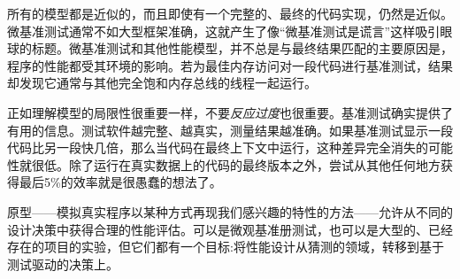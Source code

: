 所有的模型都是近似的，而且即使有一个完整的、最终的代码实现，仍然是近似。微基准测试通常不如大型框架准确，这就产生了像“微基准测试是谎言”这样吸引眼球的标题。微基准测试和其他性能模型，并不总是与最终结果匹配的主要原因是，程序的性能都受其环境的影响。若为最佳内存访问对一段代码进行基准测试，结果却发现它通常与其他完全饱和内存总线的线程一起运行。 

正如理解模型的局限性很重要一样，不要\textit{反应过度}也很重要。基准测试确实提供了有用的信息。测试软件越完整、越真实，测量结果越准确。如果基准测试显示一段代码比另一段快几倍，那么当代码在最终上下文中运行，这种差异完全消失的可能性就很低。除了运行在真实数据上的代码的最终版本之外，尝试从其他任何地方获得最后5\%的效率就是很愚蠢的想法了。

原型——模拟真实程序以某种方式再现我们感兴趣的特性的方法——允许从不同的设计决策中获得合理的性能评估。可以是微观基准册测试，也可以是大型的、已经存在的项目的实验，但它们都有一个目标:将性能设计从猜测的领域，转移到基于测试驱动的决策上。 

